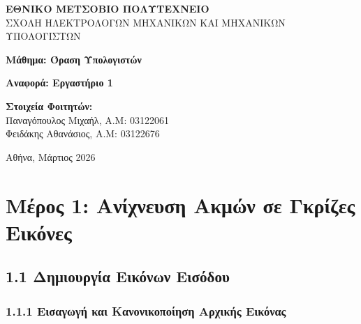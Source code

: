 \documentclass[12pt,a4paper]{article}
\begin{document}
\begin{titlepage}
    \begin{center}
        \vspace*{1cm}
        
        
        \Large
        \textbf{ΕΘΝΙΚΟ ΜΕΤΣΟΒΙΟ ΠΟΛΥΤΕΧΝΕΙΟ}\\
        \large
        ΣΧΟΛΗ ΗΛΕΚΤΡΟΛΟΓΩΝ ΜΗΧΑΝΙΚΩΝ ΚΑΙ ΜΗΧΑΝΙΚΩΝ ΥΠΟΛΟΓΙΣΤΩΝ\\[1.5cm]
        
        \vfill
        
        \Large
        \textbf{Μάθημα: Όραση Υπολογιστών}\\[0.5cm]
        
        \vfill
        
        \huge
        \textbf{Αναφορά: Εργαστήριο 1}\\[2cm]
        
        \vfill
        
        \Large
        \textbf{Στοιχεία Φοιτητών:}\\[0.5cm]
        \large
        Παναγόπουλος Μιχαήλ, Α.Μ: 03122061\\
        Φειδάκης Αθανάσιος, Α.Μ: 03122676\\[2cm]
        
        \vfill
        
        \large
        Αθήνα, Μάρτιος 2026
        
    \end{center}
\end{titlepage}

\newpage

\section*{Μέρος 1: Ανίχνευση Ακμών σε Γκρίζες Εικόνες}

\subsection*{1.1 Δημιουργία Εικόνων Εισόδου}

\subsubsection*{1.1.1 Εισαγωγή και Κανονικοποίηση Αρχικής Εικόνας}
\end{document}
